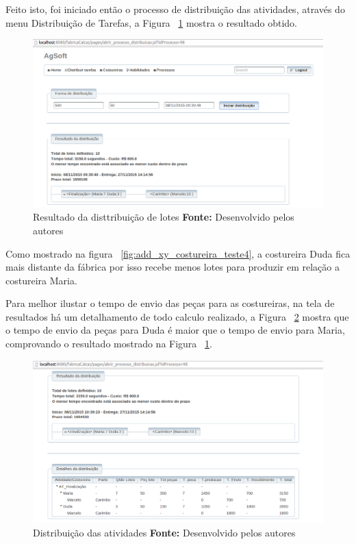 \newpage

\par Feito isto, foi iniciado então o processo de distribuição das atividades,
através do menu Distribuição de Tarefas, a Figura
~\ref{fig:resultado_transporte_teste4} mostra o resultado obtido.


\begin{figure}[h!]
	\centerline{\includegraphics[scale=0.3]{./imagens/resultado_transporte_teste4.png}}
	\caption[Resultado da disttribuição de lotes]
	{Resultado da disttribuição de lotes \textbf{Fonte:} Desenvolvido pelos autores}
	\label{fig:resultado_transporte_teste4}
\end{figure}

\par Como mostrado na figura ~\ref{fig:add_xy_costureira_teste4}, a costureira
Duda fica mais distante da fábrica por isso recebe menos lotes para produzir em
relação a costureira Maria.

\par Para melhor ilustar o tempo de envio das peças para as costureiras, na tela
de resultados há um detalhamento de todo calculo realizado, a Figura
~\ref{fig:detalhameneto_transporte_teste4} mostra que o tempo de envio da peças para Duda é 
maior que o tempo de envio para Maria, comprovando o resultado mostrado na
Figura ~\ref{fig:resultado_transporte_teste4}.

\begin{figure}[h!]
	\centerline{\includegraphics[scale=0.3]{./imagens/detalhamento_transporte_teste4.png}}
	\caption[Distribuição das atividades] 
	{Distribuição das atividades \textbf{Fonte:} Desenvolvido pelos autores}
	\label{fig:detalhameneto_transporte_teste4}
\end{figure}

